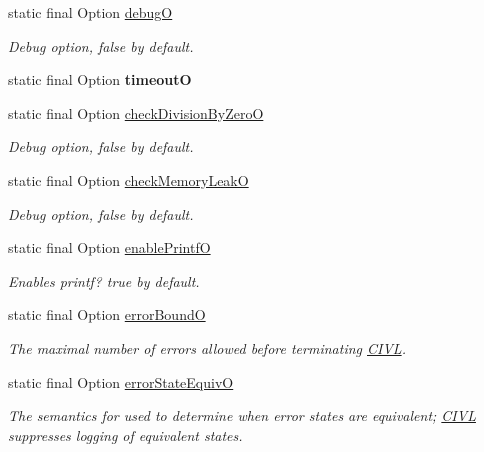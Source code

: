 \begin{DoxyCompactItemize}
\item 
static final Option \hyperlink{classedu_1_1udel_1_1cis_1_1vsl_1_1civl_1_1config_1_1IF_1_1CIVLConstants_a4aadd98fe52dfe3cafd903b857ac478a}{debug\+O}
\begin{DoxyCompactList}\small\item\em Debug option, false by default. \end{DoxyCompactList}\item 
static final Option {\bfseries timeout\+O}
\item 
static final Option \hyperlink{classedu_1_1udel_1_1cis_1_1vsl_1_1civl_1_1config_1_1IF_1_1CIVLConstants_a5c2b684020e3ff1deec767fa039bcc97}{check\+Division\+By\+Zero\+O}
\begin{DoxyCompactList}\small\item\em Debug option, false by default. \end{DoxyCompactList}\item 
static final Option \hyperlink{classedu_1_1udel_1_1cis_1_1vsl_1_1civl_1_1config_1_1IF_1_1CIVLConstants_acc813f4d9dd59a8526b4fcb80225b01a}{check\+Memory\+Leak\+O}
\begin{DoxyCompactList}\small\item\em Debug option, false by default. \end{DoxyCompactList}\item 
static final Option \hyperlink{classedu_1_1udel_1_1cis_1_1vsl_1_1civl_1_1config_1_1IF_1_1CIVLConstants_aba6c0773f174ac810556348dce16beae}{enable\+Printf\+O}
\begin{DoxyCompactList}\small\item\em Enables printf? true by default. \end{DoxyCompactList}\item 
static final Option \hyperlink{classedu_1_1udel_1_1cis_1_1vsl_1_1civl_1_1config_1_1IF_1_1CIVLConstants_ad8aeff5d4b29610b76fc8fea9065c029}{error\+Bound\+O}
\begin{DoxyCompactList}\small\item\em The maximal number of errors allowed before terminating \hyperlink{classedu_1_1udel_1_1cis_1_1vsl_1_1civl_1_1CIVL}{C\+I\+V\+L}. \end{DoxyCompactList}\item 
static final Option \hyperlink{classedu_1_1udel_1_1cis_1_1vsl_1_1civl_1_1config_1_1IF_1_1CIVLConstants_a2fe4ea5554b04c9631df30301f614ef9}{error\+State\+Equiv\+O}
\begin{DoxyCompactList}\small\item\em The semantics for used to determine when error states are equivalent; \hyperlink{classedu_1_1udel_1_1cis_1_1vsl_1_1civl_1_1CIVL}{C\+I\+V\+L} suppresses logging of equivalent states. \end{DoxyCompactList}\item 

\end{DoxyCompactItemize}
